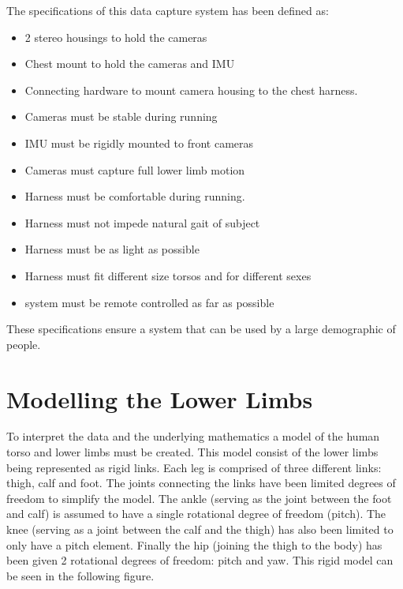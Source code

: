 The specifications of this data capture system has been defined as:
\begin{itemize}
\item 2 stereo housings to hold the cameras
\item Chest mount to hold the cameras and IMU
\item Connecting hardware to mount camera housing to the chest harness.
\item Cameras must be stable during running
\item IMU must be rigidly mounted to front cameras
\item Cameras must capture full lower limb motion
\item Harness must be comfortable during running.
\item Harness must not impede natural gait of subject
\item Harness must be as light as possible
\item Harness must fit different size torsos and for different sexes
\item system must be remote controlled as far as possible 
\end{itemize}

These specifications ensure a system that can be used by a large demographic of people.

\section{Modelling the Lower Limbs}
To interpret the data and the underlying mathematics a model of the human torso and lower limbs must be created. This model consist of the lower limbs being represented as rigid links. Each leg is comprised of three different links: thigh, calf and foot. The joints connecting the links have been limited degrees of freedom to simplify the model. The ankle (serving as the joint between the foot and calf) is assumed to have a single rotational degree of freedom (pitch). The knee (serving as a joint between the calf and the thigh) has also been limited to only have a pitch element. Finally the hip (joining the thigh to the body) has been given 2 rotational degrees of freedom: pitch and yaw. This rigid model can be seen in the following figure.

